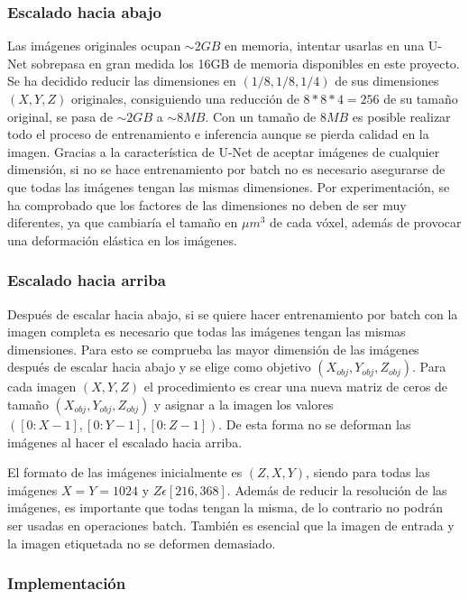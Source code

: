 \subsubsection{Escalado hacia abajo}\label{subsubsec:downscale}

Las imágenes originales ocupan $\sim 2GB$ en memoria, intentar usarlas en una U-Net sobrepasa en gran medida los 16GB de memoria disponibles en este proyecto. Se ha decidido reducir las dimensiones en $(1/8, 1/8, 1/4)$ de sus dimensiones $(X, Y, Z)$ originales, consiguiendo una reducción de $8*8*4=256$ de su tamaño original, se pasa de $\sim 2GB$ a $\sim 8MB$. Con un tamaño de $8MB$ es posible realizar todo el proceso de entrenamiento e inferencia aunque se pierda calidad en la imagen. Gracias a la característica de U-Net de aceptar imágenes de cualquier dimensión, si no se hace entrenamiento por batch no es necesario asegurarse de que todas las imágenes tengan las mismas dimensiones. Por experimentación, se ha comprobado que los factores de las dimensiones no deben de ser muy diferentes, ya que cambiaría el tamaño en $\mu m^3$ de cada vóxel, además de provocar una deformación elástica en los imágenes.

\subsubsection{Escalado hacia arriba}\label{subsubsec:upscale}

Después de escalar hacia abajo, si se quiere hacer entrenamiento por batch con la imagen completa es necesario que todas las imágenes tengan las mismas dimensiones. Para esto se comprueba las mayor dimensión de las imágenes después de escalar hacia abajo y se elige como objetivo $(X_{obj}, Y_{obj}, Z_{obj})$. Para cada imagen $(X, Y, Z)$ el procedimiento es crear una nueva matriz de ceros de tamaño $(X_{obj}, Y_{obj}, Z_{obj})$ y asignar a la imagen los valores $([0:X-1],[0:Y-1],[0:Z-1])$. De esta forma no se deforman las imágenes al hacer el escalado hacia arriba.

El formato de las imágenes inicialmente es $ (Z,X,Y) $, siendo para todas las imágenes $ X = Y = 1024 $ y $ Z\epsilon[216,368] $. Además de reducir la resolución de las imágenes, es importante que todas tengan la misma, de lo contrario no podrán ser usadas en operaciones batch. También es esencial que la imagen de entrada y la imagen etiquetada no se deformen demasiado.

\subsubsection{Implementación}\label{subsec:size_problem_implementation}


